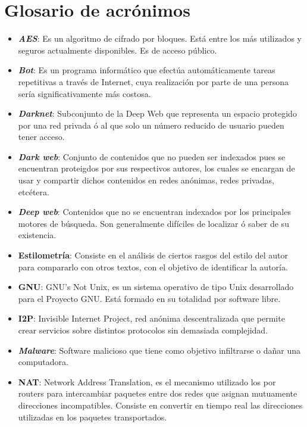 \chapter*{Glosario de acrónimos}

\begin{itemize}
\item{\textbf{\textit{AES}}: Es un algoritmo de cifrado por bloques. Está entre los más utilizados y seguros actualmente disponibles. Es de acceso público.}	
\item{\textbf{\textit{Bot}}: Es un programa informático que efectúa automáticamente tareas repetitivas a través de Internet, cuya realización por parte de una persona sería significativamente más costosa.}	
\item{\textbf{\textit{Darknet}}: Subconjunto de la Deep Web que representa un espacio protegido por una red privada ó al que solo un número reducido de usuario pueden tener acceso.}
\item{\textbf{\textit{Dark web}}: Conjunto de contenidos que no pueden ser indexados pues se encuentran proteigdos por sus respectivos autores, los cuales se encargan de usar y compartir dichos contenidos en redes anónimas, redes privadas, etcétera.}
\item{\textbf{\textit{Deep web}}: Contenidos que no se encuentran indexados por los principales motores de búsqueda. Son generalmente difíciles de localizar ó saber de su existencia.}
\item{\textbf{Estilometría}: Consiste en el análisis de ciertos rasgos del estilo del autor para compararlo con otros textos, con el objetivo de identificar la autoría.}
\item{\textbf{GNU}: GNU's Not Unix, es un sistema operativo de tipo Unix desarrollado para el Proyecto GNU. Está formado en su totalidad por software libre.}
\item{\textbf{I2P}: Invisible Internet Project, red anónima descentralizada que permite crear servicios sobre distintos protocolos sin demasiada complejidad.}
\item{\textbf{\textit{Malware}}: Software malicioso que tiene como objetivo infiltrarse o dañar una computadora.}
\item{\textbf{NAT}: Network Address Translation, es el mecanismo utilizado los por routers para intercambiar paquetes entre dos redes que asignan mutuamente direcciones incompatibles. Consiste en convertir en tiempo real las direcciones utilizadas en los paquetes transportados.}

\end{itemize}
